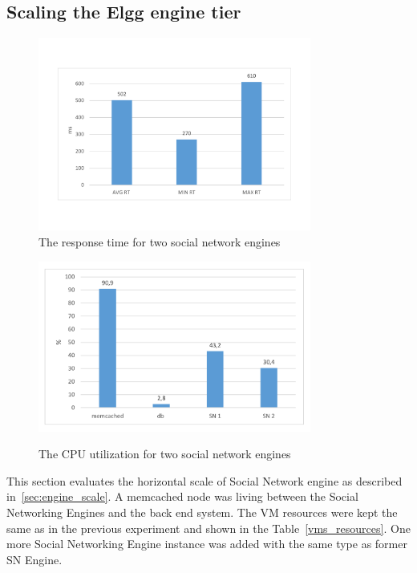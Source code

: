 \subsection{Scaling the Elgg engine tier}

\begin{figure}[h]
	\centering
	\includegraphics[width=0.8\textwidth,natwidth=200,natheight=150]{./fig/RT2SN.pdf}
	\caption{The response time for two social network engines}
	\label{fig:rt2SN}
\end{figure}

\begin{figure}[h]
	\caption{The CPU utilization for two social network engines}
	\includegraphics[width=0.8\textwidth,natwidth=200,natheight=150]{./fig/Usage2SN.pdf}
	\centering
	\label{fig:cpu2SNavg}
\end{figure}

This section evaluates the horizontal scale of Social Network engine as described in~\ref{sec:engine_scale}. A memcached node was living between the Social Networking Engines and the back end system. The VM resources were kept the same as in the previous experiment and shown in the Table~\ref{vms_resources}. One more Social Networking Engine instance was added with the same type as former SN Engine. 

